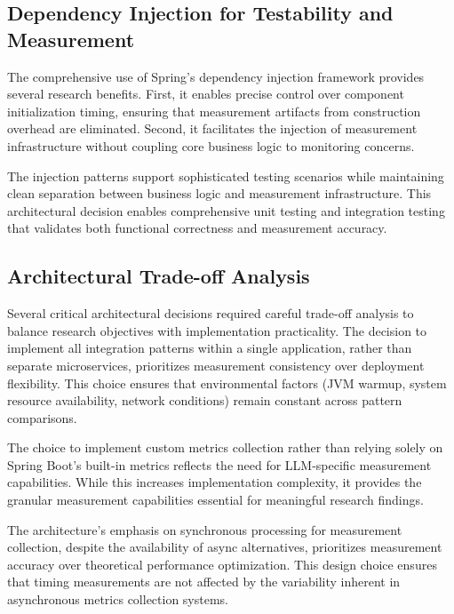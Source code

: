 \subsection{Dependency Injection for Testability and Measurement}

The comprehensive use of Spring's dependency injection framework provides several research benefits. First, it enables precise control over component initialization timing, ensuring that measurement artifacts from construction overhead are eliminated. Second, it facilitates the injection of measurement infrastructure without coupling core business logic to monitoring concerns.

The injection patterns support sophisticated testing scenarios while maintaining clean separation between business logic and measurement infrastructure. This architectural decision enables comprehensive unit testing and integration testing that validates both functional correctness and measurement accuracy.


\subsection{Architectural Trade-off Analysis}

Several critical architectural decisions required careful trade-off analysis to balance research objectives with implementation practicality. The decision to implement all integration patterns within a single application, rather than separate microservices, prioritizes measurement consistency over deployment flexibility. This choice ensures that environmental factors (JVM warmup, system resource availability, network conditions) remain constant across pattern comparisons.

The choice to implement custom metrics collection rather than relying solely on Spring Boot's built-in metrics reflects the need for LLM-specific measurement capabilities. While this increases implementation complexity, it provides the granular measurement capabilities essential for meaningful research findings.

The architecture's emphasis on synchronous processing for measurement collection, despite the availability of async alternatives, prioritizes measurement accuracy over theoretical performance optimization. This design choice ensures that timing measurements are not affected by the variability inherent in asynchronous metrics collection systems.

